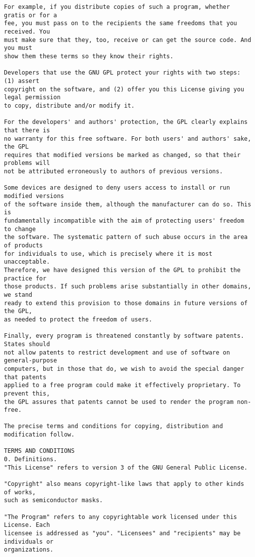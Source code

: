 \begin{verbatim}
For example, if you distribute copies of such a program, whether gratis or for a
fee, you must pass on to the recipients the same freedoms that you received. You
must make sure that they, too, receive or can get the source code. And you must
show them these terms so they know their rights.

Developers that use the GNU GPL protect your rights with two steps: (1) assert
copyright on the software, and (2) offer you this License giving you legal permission
to copy, distribute and/or modify it.

For the developers' and authors' protection, the GPL clearly explains that there is
no warranty for this free software. For both users' and authors' sake, the GPL
requires that modified versions be marked as changed, so that their problems will
not be attributed erroneously to authors of previous versions.

Some devices are designed to deny users access to install or run modified versions
of the software inside them, although the manufacturer can do so. This is
fundamentally incompatible with the aim of protecting users' freedom to change
the software. The systematic pattern of such abuse occurs in the area of products
for individuals to use, which is precisely where it is most unacceptable.
Therefore, we have designed this version of the GPL to prohibit the practice for
those products. If such problems arise substantially in other domains, we stand
ready to extend this provision to those domains in future versions of the GPL,
as needed to protect the freedom of users.

Finally, every program is threatened constantly by software patents. States should
not allow patents to restrict development and use of software on general-purpose
computers, but in those that do, we wish to avoid the special danger that patents
applied to a free program could make it effectively proprietary. To prevent this,
the GPL assures that patents cannot be used to render the program non-free.

The precise terms and conditions for copying, distribution and modification follow.

TERMS AND CONDITIONS
0. Definitions.
"This License" refers to version 3 of the GNU General Public License.

"Copyright" also means copyright-like laws that apply to other kinds of works,
such as semiconductor masks.

"The Program" refers to any copyrightable work licensed under this License. Each
licensee is addressed as "you". "Licensees" and "recipients" may be individuals or
organizations.


\end{verbatim}
